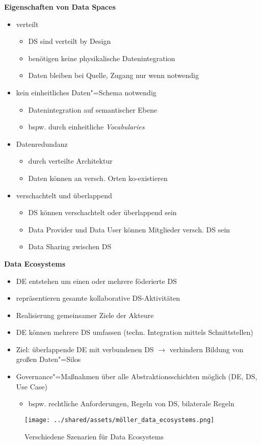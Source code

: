 \textbf{Eigenschaften von Data Spaces}
\begin{itemize}
    \item verteilt
    \begin{itemize}
        \item DS sind verteilt by Design
        \item benötigen keine physikalische Datenintegration
        \item Daten bleiben bei Quelle, Zugang nur wenn notwendig
    \end{itemize}

    \item kein einheitliches Daten"=Schema notwendig
    \begin{itemize}
        \item Datenintegration auf semantischer Ebene
        \item bspw. durch einheitliche \emph{Vocabularies}
    \end{itemize}
    
    \item Datenredundanz
    \begin{itemize}
        \item durch verteilte Architektur
        \item Daten können an versch. Orten ko-existieren
    \end{itemize}
    
    \item verschachtelt und überlappend
    \begin{itemize}
        \item DS können verschachtelt oder überlappend sein
        \item Data Provider und Data User können Mitglieder versch. DS sein
        \item Data Sharing zwischen DS~\cite{mollerIndustrialDataEcosystems2024}
    \end{itemize}
\end{itemize}

\vspace{1cm}

\textbf{Data Ecosystems}
\begin{itemize}
    \item DE entstehen um einen oder mehrere föderierte DS
    \item repräsentieren gesamte kollaborative DS-Aktivitäten
    \item Realisierung gemeinsamer Ziele der Akteure
    \item DE können mehrere DS umfassen (techn. Integration mittels Schnittstellen)
    \item Ziel: überlappende DE mit verbundenen DS $\to$ verhindern Bildung von großen Daten"=Silos
    \item Governance"=Maßnahmen über alle Abstraktionsschichten möglich (DE, DS, Use Case)
    \begin{itemize}
        \item bspw. rechtliche Anforderungen, Regeln von DS, bilaterale Regeln
    \end{itemize}
\end{itemize}

\begin{figure}
    \texttt{[image: ../shared/assets/möller\_data\_ecosystems.png]}
    \caption{Verschiedene Szenarien für Data Ecosystems~\cite{mollerIndustrialDataEcosystems2024}}
\end{figure}
